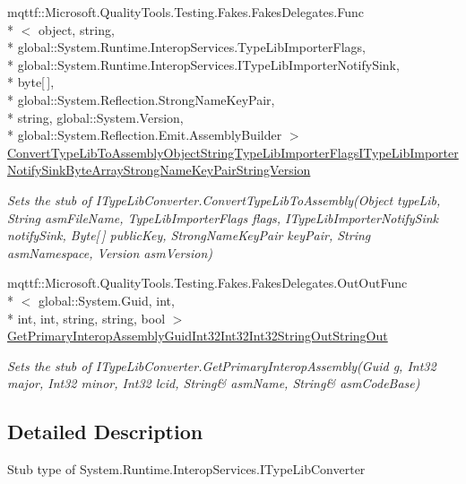\begin{DoxyCompactItemize}
mqttf\-::\-Microsoft.\-Quality\-Tools.\-Testing.\-Fakes.\-Fakes\-Delegates.\-Func\\*
$<$ object, string, \\*
global\-::\-System.\-Runtime.\-Interop\-Services.\-Type\-Lib\-Importer\-Flags, \\*
global\-::\-System.\-Runtime.\-Interop\-Services.\-I\-Type\-Lib\-Importer\-Notify\-Sink, \\*
byte\mbox{[}$\,$\mbox{]}, \\*
global\-::\-System.\-Reflection.\-Strong\-Name\-Key\-Pair, \\*
string, global\-::\-System.\-Version, \\*
global\-::\-System.\-Reflection.\-Emit.\-Assembly\-Builder $>$ \hyperlink{class_system_1_1_runtime_1_1_interop_services_1_1_fakes_1_1_stub_i_type_lib_converter_a1fc8bdc1965f71e6601b04ec0ce5a7fa}{Convert\-Type\-Lib\-To\-Assembly\-Object\-String\-Type\-Lib\-Importer\-Flags\-I\-Type\-Lib\-Importer\-Notify\-Sink\-Byte\-Array\-Strong\-Name\-Key\-Pair\-String\-Version}
\begin{DoxyCompactList}\small\item\em Sets the stub of I\-Type\-Lib\-Converter.\-Convert\-Type\-Lib\-To\-Assembly(\-Object type\-Lib, String asm\-File\-Name, Type\-Lib\-Importer\-Flags flags, I\-Type\-Lib\-Importer\-Notify\-Sink notify\-Sink, Byte\mbox{[}$\,$\mbox{]} public\-Key, Strong\-Name\-Key\-Pair key\-Pair, String asm\-Namespace, Version asm\-Version)\end{DoxyCompactList}\item 
mqttf\-::\-Microsoft.\-Quality\-Tools.\-Testing.\-Fakes.\-Fakes\-Delegates.\-Out\-Out\-Func\\*
$<$ global\-::\-System.\-Guid, int, \\*
int, int, string, string, bool $>$ \hyperlink{class_system_1_1_runtime_1_1_interop_services_1_1_fakes_1_1_stub_i_type_lib_converter_a9f2b70f8bc64fa3c020561f296498633}{Get\-Primary\-Interop\-Assembly\-Guid\-Int32\-Int32\-Int32\-String\-Out\-String\-Out}
\begin{DoxyCompactList}\small\item\em Sets the stub of I\-Type\-Lib\-Converter.\-Get\-Primary\-Interop\-Assembly(Guid g, Int32 major, Int32 minor, Int32 lcid, String\& asm\-Name, String\& asm\-Code\-Base)\end{DoxyCompactList}\end{DoxyCompactItemize}


\subsection{Detailed Description}
Stub type of System.\-Runtime.\-Interop\-Services.\-I\-Type\-Lib\-Converter



